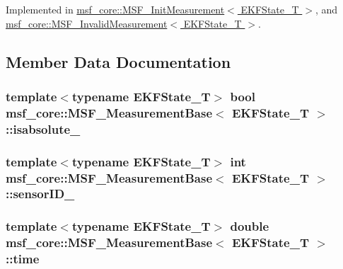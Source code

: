 Implemented in \hyperlink{classmsf__core_1_1MSF__InitMeasurement_a6ade2a1ba88e5f26de2125258e4c5238}{msf\-\_\-core\-::\-M\-S\-F\-\_\-\-Init\-Measurement$<$ E\-K\-F\-State\-\_\-\-T $>$}, and \hyperlink{classmsf__core_1_1MSF__InvalidMeasurement_abe3df54c608c49a3a26905b5d953713a}{msf\-\_\-core\-::\-M\-S\-F\-\_\-\-Invalid\-Measurement$<$ E\-K\-F\-State\-\_\-\-T $>$}.



\subsection{Member Data Documentation}
\hypertarget{classmsf__core_1_1MSF__MeasurementBase_ad1ea7c4d392ecd3d894280283c04757a}{
\subsubsection[{isabsolute\-\_\-}]{\setlength{\rightskip}{0pt plus 5cm}template$<$typename E\-K\-F\-State\-\_\-\-T$>$ bool {\bf msf\-\_\-core\-::\-M\-S\-F\-\_\-\-Measurement\-Base}$<$ E\-K\-F\-State\-\_\-\-T $>$\-::isabsolute\-\_\-}}\label{classmsf__core_1_1MSF__MeasurementBase_ad1ea7c4d392ecd3d894280283c04757a}
\hypertarget{classmsf__core_1_1MSF__MeasurementBase_afad7c30029f47cea027415c04301dc48}{
\subsubsection[{sensor\-I\-D\-\_\-}]{\setlength{\rightskip}{0pt plus 5cm}template$<$typename E\-K\-F\-State\-\_\-\-T$>$ int {\bf msf\-\_\-core\-::\-M\-S\-F\-\_\-\-Measurement\-Base}$<$ E\-K\-F\-State\-\_\-\-T $>$\-::sensor\-I\-D\-\_\-}}\label{classmsf__core_1_1MSF__MeasurementBase_afad7c30029f47cea027415c04301dc48}
\hypertarget{classmsf__core_1_1MSF__MeasurementBase_a48b55b129f13afbed86db1b0543562db}{
\subsubsection[{time}]{\setlength{\rightskip}{0pt plus 5cm}template$<$typename E\-K\-F\-State\-\_\-\-T$>$ double {\bf msf\-\_\-core\-::\-M\-S\-F\-\_\-\-Measurement\-Base}$<$ E\-K\-F\-State\-\_\-\-T $>$\-::time}}\label{classmsf__core_1_1MSF__MeasurementBase_a48b55b129f13afbed86db1b0543562db}


